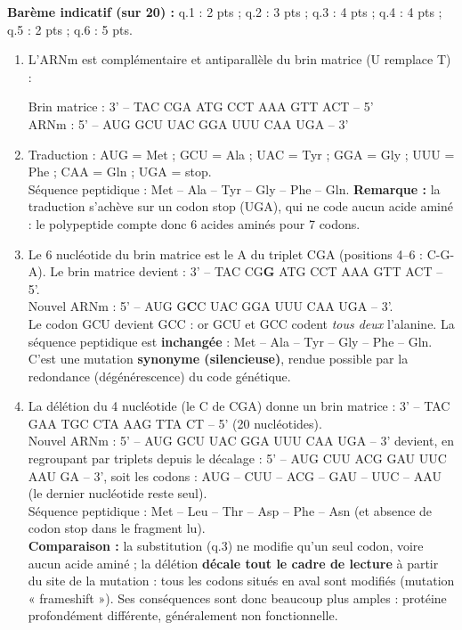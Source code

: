 \documentclass[11pt]{article}
\begin{document}
\begin{corrige}
\textbf{Barème indicatif (sur 20) :} q.1 : 2 pts ; q.2 : 3 pts ; q.3 : 4 pts ; q.4 : 4 pts ; q.5 : 2 pts ; q.6 : 5 pts.

\begin{enumerate}
\item L'ARNm est complémentaire et antiparallèle du brin matrice (U remplace T) :
\begin{center}
Brin matrice : 3' -- TAC CGA ATG CCT AAA GTT ACT -- 5'\\
ARNm : 5' -- AUG GCU UAC GGA UUU CAA UGA -- 3'
\end{center}
\item Traduction : AUG = Met ; GCU = Ala ; UAC = Tyr ; GGA = Gly ; UUU = Phe ; CAA = Gln ; UGA = stop.\\
Séquence peptidique : Met -- Ala -- Tyr -- Gly -- Phe -- Gln. \textbf{Remarque :} la traduction s'achève sur un codon stop (UGA), qui ne code aucun acide aminé : le polypeptide compte donc 6 acides aminés pour 7 codons.
\item Le 6 nucléotide du brin matrice est le A du triplet CGA (positions 4--6 : C-G-A). Le brin matrice devient : 3' -- TAC CG\textbf{G} ATG CCT AAA GTT ACT -- 5'.\\
Nouvel ARNm : 5' -- AUG G\textbf{C}C UAC GGA UUU CAA UGA -- 3'.\\
Le codon GCU devient GCC : or GCU et GCC codent \emph{tous deux} l'alanine. La séquence peptidique est \textbf{inchangée} : Met -- Ala -- Tyr -- Gly -- Phe -- Gln. C'est une mutation \textbf{synonyme (silencieuse)}, rendue possible par la redondance (dégénérescence) du code génétique.
\item La délétion du 4 nucléotide (le C de CGA) donne un brin matrice : 3' -- TAC GAA TGC CTA AAG TTA CT -- 5' (20 nucléotides).\\
Nouvel ARNm : 5' -- AUG GCU UAC GGA UUU CAA UGA -- 3' devient, en regroupant par triplets depuis le décalage : 5' -- AUG CUU ACG GAU UUC AAU GA -- 3', soit les codons : AUG -- CUU -- ACG -- GAU -- UUC -- AAU (le dernier nucléotide reste seul).\\
Séquence peptidique : Met -- Leu -- Thr -- Asp -- Phe -- Asn (et absence de codon stop dans le fragment lu).\\
\textbf{Comparaison :} la substitution (q.3) ne modifie qu'un seul codon, voire aucun acide aminé ; la délétion \textbf{décale tout le cadre de lecture} à partir du site de la mutation : tous les codons situés en aval sont modifiés (mutation « frameshift »). Ses conséquences sont donc beaucoup plus amples : protéine profondément différente, généralement non fonctionnelle.

\end{enumerate}
\end{corrige}
\end{document}
